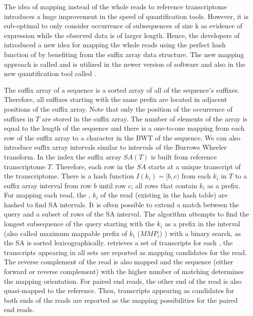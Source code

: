 The idea of mapping \kmers instead of the whole reads to reference transcriptome 
introduces a huge improvement in the speed of quantification tools. However, 
it is sub-optimal to only consider occurrence of subsequences of size k as 
evidence of expression while the observed data is of larger length. Hence, 
the developers of \sailfish introduced a new idea for mapping the whole reads 
using the perfect hash function of \kmers by benefiting from the suffix array 
data structure. The new mapping approach is called \Qm \citep{Srivastava2016rapmap} 
and is utilized in the newer version of \sailfish software and also in the new 
quantification tool called \salmon \citep{Patro2017Salmon}. 

The suffix array of a sequence is a sorted array of all of the sequence's suffixes. 
Therefore, all suffixes starting with the same prefix are located in adjacent 
positions of the suffix array. Note that only the position of the occurrence of 
suffixes in $T$ are stored in the suffix array. The number of elements of the 
array is equal to the length of the sequence and there is a one-to-one mapping 
from each row of the suffix array to a character in the BWT of the sequence. We 
can also introduce suffix array intervals similar to intervals of the 
Burrows Wheeler transform. In the \qm index the suffix array $SA(T)$ is built from 
reference transcriptome $T$. Therefore, each row in the $SA$ starts at a unique 
transcript of the transcriptome. There is a hash function $I(k_i)=[b,c)$ from 
each \kmer $k_i$ in $T$ to a suffix array interval from row $b$ until row $c$; 
all rows that contain $k_i$ as a prefix. For mapping each read, the \kmers, $k_i$ 
of the read (existing in the hash table) are hashed to find SA intervals. It is 
often possible to extend a match between the query and a subset of rows of the SA 
interval. The \qm algorithm attempts to find the longest subsequence of the query 
starting with the $k_i$ as a prefix in the interval (also called maximum mappable 
prefix of $k_i$ ($MMP_i$) \citep{Dobin2013Star}) with a binary search, as the SA 
is sorted lexicographically.
\Qm retrieves a set of transcripts for each \kmer, the transcripts appearing 
in all sets are reported as mapping candidates for the read. The reverse 
complement of the read is also mapped and the sequence (either forward or 
reverse complement) with the higher number of matching \kmers determines the 
mapping orientation. For paired end reads, the other end of the read is also 
quasi-mapped to the reference. Then, transcripts appearing as candidates for 
both ends of the reads are reported as the mapping possibilities for the paired 
end reads.


